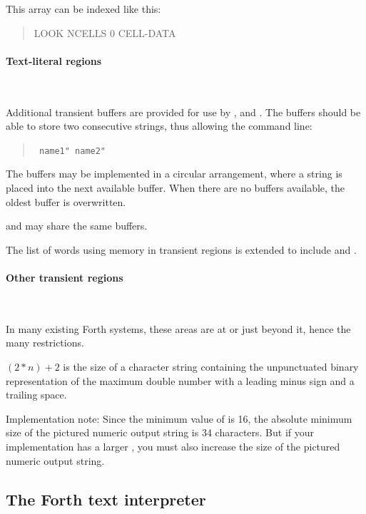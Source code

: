 This array can be indexed like this:

\begin{quote}\ttfamily
	\word{:} LOOK \quad
		NCELLS 0 
			CELL-DATA   \word{+} 
	\word{;}
\end{quote}


\setcounter{paragraph}{3}
\paragraph{Text-literal regions} ~
\label{rat:"literal}

Additional transient buffers are provided for use by ,  and
.  The buffers should be able to store two consecutive strings, thus
allowing the command line:

\begin{quote}
	\texttt{ name1"  name2" }
\end{quote}

The buffers may be implemented in a circular arrangement, where a string
is placed into the next available buffer. When there are no buffers available,
the oldest buffer is overwritten.

 and  may share the same buffers.

The list of words using memory in transient regions is extended to include
 and .


\setcounter{paragraph}{5}
\paragraph{Other transient regions} ~ %

In many existing Forth systems, these areas are at  or
just beyond it, hence the many restrictions.

$(2*n)+2$ is the size of a character string containing the
unpunctuated binary representation of the maximum double number with
a leading minus sign and a trailing space.

Implementation note: Since the minimum value of  is 16, the
absolute minimum size of the pictured numeric output string is 34
characters. But if your implementation has a larger , you must
also increase the size of the pictured numeric output string.

\subsection{The Forth text interpreter} %

